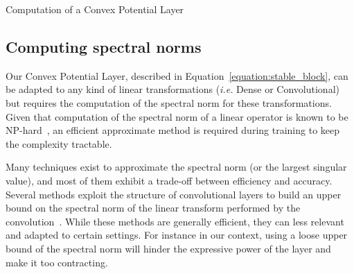 \begin{algorithm}[tb]
\caption{Computation of a Convex Potential Layer}
\label{algorithm:stable_block}
\begin{algorithmic}
\end{algorithmic}
\end{algorithm}




\subsection{Computing spectral norms}
Our Convex Potential Layer, described in Equation~\ref{equation:stable_block}, can be adapted to any kind of linear transformations (\emph{i.e.} Dense or Convolutional) but requires the computation of the spectral norm for these transformations.
Given that computation of the spectral norm of a linear operator is known to be NP-hard~\citep{steinberg2005computation}, an efficient approximate method is required during training to keep the complexity tractable. 


Many techniques exist to approximate the spectral norm (or the largest singular value), and most of them exhibit a trade-off between efficiency and accuracy.
Several methods exploit the structure of convolutional layers to build an upper bound on the spectral norm of the linear transform performed by the convolution~\citep{jia2017improving,singla2021fantastic,araujo2021lipschitz}.
While these methods are generally efficient, they can less relevant and adapted to certain settings. For instance in our context, using a loose upper bound of the spectral norm will hinder the expressive power of the layer and make it too contracting.

